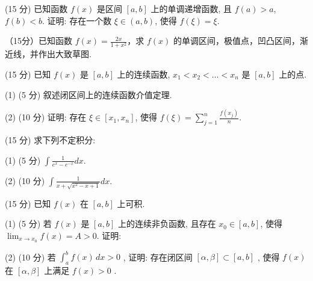 \par{}
(15 分) 已知函数 $f(x)$ 是区间 $[a, b]$ 上的单调递增函数, 且 $f(a) > a$, $f(b) < b$. 证明: 存在一个数 $\xi \in (a, b)$, 使得 $f(\xi) = \xi$.\par
\par{}
（15分）已知函数 $f(x) = \frac{2x}{1 + x^2}$，求 $f(x)$ 的单调区间，极值点，凹凸区间，渐近线，并作出大致草图.\par
\par{}
(15 分) 已知 $f(x)$ 是 $[a, b]$ 上的连续函数, $x_1 < x_2 < \dots < x_n$ 是 $[a, b]$ 上的点.\par
(1) (5 分) 叙述闭区间上的连续函数介值定理.\par
(2) (10 分) 证明: 存在 $\xi \in [x_1, x_n]$, 使得 $f(\xi) = \sum_{j=1}^{n} \frac{f(x_j)}{n}$.\par
\par{}
(15 分) 求下列不定积分:\par
(1) (5 分)  $\int \frac{1}{e^{x} - e^{-x}} dx.$\par
(2) (10 分)  $\int \frac{1}{x + \sqrt{x^{2} - x + 1}} dx.$\par
\par{}
(15 分) 已知 $f(x)$ 在 $[a, b]$ 上可积.\par
\par{}
(1) (5 分) 若 $f(x)$ 是 $[a, b]$ 上的连续非负函数, 且存在 $x_0 \in [a, b]$, 使得 $\lim_{x \to x_0} f(x) = A > 0$. 证明:\par
\nopagebreak[4]
(2) (10 分) 若  $\int_{a}^{b} f(x) \, dx > 0$ , 证明: 存在闭区间  $[\alpha, \beta] \subset [a, b]$ , 使得  $f(x)$  在  $[\alpha, \beta]$  上满足  $f(x) > 0$ .
